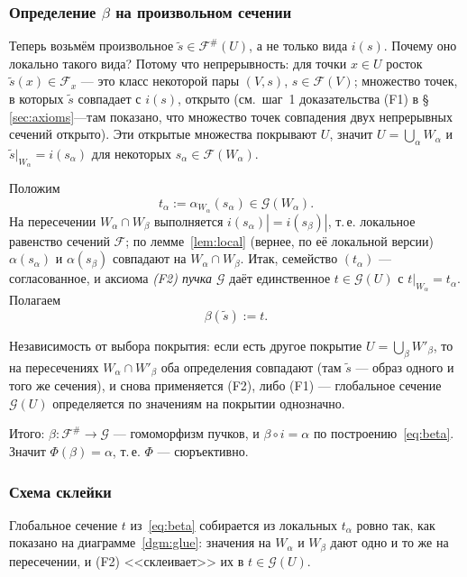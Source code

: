 \documentclass[11pt,b5paper]{article}
\newcommand{\Shv}[1]{\mathscr{#1}}   %
\theoremstyle{plain}
\theoremstyle{definition}
\theoremstyle{remark}
\newcounter{dgm}[section]
\begin{document}
\subsubsection*{Определение $\beta$ на произвольном сечении}

Теперь возьмём произвольное $\tilde s\in\Shv{F}^{\#}(U)$, а не только
вида $i(s)$. Почему оно локально такого вида? Потому что непрерывность:
для точки $x\in U$ росток $\tilde s(x)\in\Shv{F}_x$ --- это класс
некоторой пары $(V,s)$, $s\in\Shv{F}(V)$; множество точек, в которых
$\tilde s$ совпадает с $i(s)$, открыто (см.~шаг~1 доказательства
(F1) в \S\,\ref{sec:axioms}---там показано, что множество точек
совпадения двух непрерывных сечений открыто). Эти открытые множества
покрывают $U$, значит $U=\bigcup_\alpha W_\alpha$ и
$\tilde s|_{W_\alpha}=i(s_\alpha)$ для некоторых
$s_\alpha\in\Shv{F}(W_\alpha)$.

Положим
\[
 t_\alpha:=\alpha_{W_\alpha}(s_\alpha)\in\Shv{G}(W_\alpha).
\]
На пересечении $W_\alpha\cap W_\beta$ выполняется
$i(s_\alpha)|=i(s_\beta)|$, т.\,е. локальное равенство сечений
$\Shv{F}$; по лемме~\ref{lem:local} (вернее, по её локальной версии)
$\alpha(s_\alpha)$ и $\alpha(s_\beta)$ совпадают на
$W_\alpha\cap W_\beta$. Итак, семейство $(t_\alpha)$ --- согласованное,
и аксиома \emph{(F2) пучка $\Shv{G}$} даёт единственное
$t\in\Shv{G}(U)$ с $t|_{W_\alpha}=t_\alpha$. Полагаем
\begin{equation}\label{eq:beta}
 \beta(\tilde s):=t.
\end{equation}

Независимость от выбора покрытия: если есть другое покрытие
$U=\bigcup_\beta W'_\beta$, то на пересечениях $W_\alpha\cap W'_\beta$
оба определения совпадают (там $\tilde s$ --- образ одного и того же
сечения), и снова применяется (F2), либо (F1) --- глобальное сечение
$\Shv{G}(U)$ определяется по значениям на покрытии однозначно.

Итого: $\beta\colon\Shv{F}^{\#}\to\Shv{G}$ --- гомоморфизм пучков,
и $\beta\circ i=\alpha$ по построению~\eqref{eq:beta}. Значит
$\Phi(\beta)=\alpha$, т.\,е. $\Phi$ --- сюръективно.

\subsubsection*{Схема склейки}

Глобальное сечение $t$ из~\eqref{eq:beta} собирается из локальных
$t_\alpha$ ровно так, как показано на диаграмме~\ref{dgm:glue}: значения
на $W_\alpha$ и $W_\beta$ дают одно и то же на пересечении, и (F2)
<<склеивает>> их в $t\in\Shv{G}(U)$.
\end{document}
